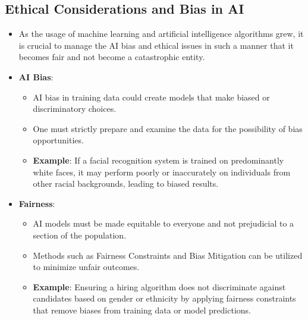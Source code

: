 \documentclass{article}
\begin{document}
\subsection{ Ethical Considerations and Bias in AI}
\begin{itemize}
\item As the usage of machine learning and artificial intelligence algorithms grew, it is crucial to manage the AI bias and ethical issues in such a manner that it becomes fair and not become a catastrophic entity.
\item \textbf{AI Bias}:
\begin{itemize}
\item AI bias in training data could create models that make biased or discriminatory choices. 
\item One must strictly prepare and examine the data for the possibility of bias opportunities.
\item \textbf{Example}: If a facial recognition system is trained on predominantly white faces, it may perform poorly or inaccurately on individuals from other racial backgrounds, leading to biased results.

\end{itemize}
\item \textbf{Fairness}:
\begin{itemize}
\item AI models must be made equitable to everyone and not prejudicial to a section of the population. 
\item Methods such as Fairness Constraints and Bias Mitigation can be utilized to minimize unfair outcomes.
\item \textbf{Example}: Ensuring a hiring algorithm does not discriminate against candidates based on gender or ethnicity by applying fairness constraints that remove biases from training data or model predictions.



\end{itemize}
\end{itemize}
\end{document}
